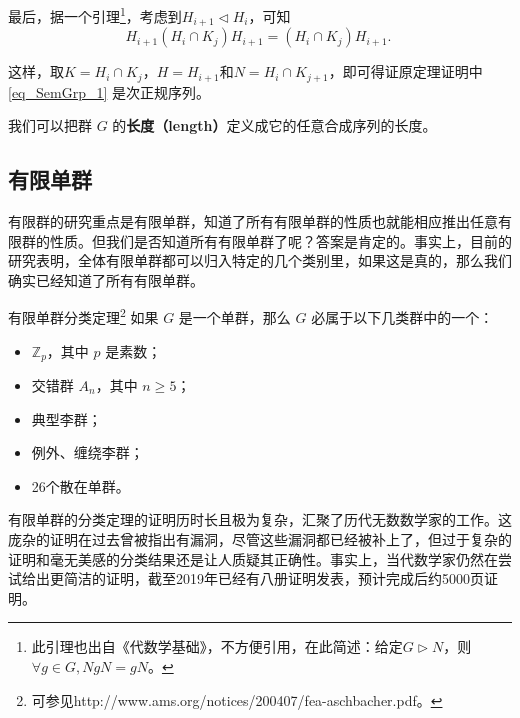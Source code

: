 最后，据一个引理\footnote{此引理也出自《代数学基础》，不方便引用，在此简述：给定$G\rhd N$，则$\forall g\in G, NgN=gN$。}，考虑到$H_{i+1}\lhd H_i$，可知
\begin{equation}
H_{i+1}(H_i\cap K_j)H_{i+1}=(H_i\cap K_j)H_{i+1}. ~
\end{equation}


这样，取$K=H_i\cap K_j$，$H=H_{i+1}$和$N=H_i\cap K_{j+1}$，即可得证原定理证明中\autoref{eq_SemGrp_1} 是次正规序列。










我们可以把群 $G$ 的\textbf{长度（length）}定义成它的任意合成序列的长度。

\subsection{有限单群}

有限群的研究重点是有限单群，知道了所有有限单群的性质也就能相应推出任意有限群的性质。但我们是否知道所有有限单群了呢？答案是肯定的。事实上，目前的研究表明，全体有限单群都可以归入特定的几个类别里，如果这是真的，那么我们确实已经知道了所有有限单群。

\begin{definition}{有限单群分类定理\footnote{可参见http://www.ams.org/notices/200407/fea-aschbacher.pdf。}}
如果 $G$ 是一个单群，那么 $G$ 必属于以下几类群中的一个：
\begin{itemize}
\item $\mathbb{Z}_p$，其中 $p$ 是素数；
\item 交错群 $A_n$，其中 $n\geq 5$；
\item 典型李群；
\item 例外、缠绕李群；
\item 26个散在单群。
\end{itemize}
\end{definition}

有限单群的分类定理的证明历时长且极为复杂，汇聚了历代无数数学家的工作。这庞杂的证明在过去曾被指出有漏洞，尽管这些漏洞都已经被补上了，但过于复杂的证明和毫无美感的分类结果还是让人质疑其正确性。事实上，当代数学家仍然在尝试给出更简洁的证明，截至2019年已经有八册证明发表，预计完成后约5000页证明。












